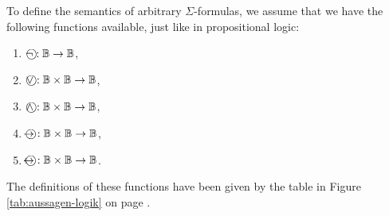 To define the semantics of arbitrary $\Sigma$-formulas, we assume that we have the following functions
available, just like in propositional logic: 
\begin{enumerate}
\item $\circneg: \mathbb{B} \rightarrow \mathbb{B}$,
\item $\circvee: \mathbb{B} \times \mathbb{B} \rightarrow \mathbb{B}$,
\item $\circwedge: \mathbb{B} \times \mathbb{B} \rightarrow \mathbb{B}$,
\item $\circright: \mathbb{B} \times \mathbb{B} \rightarrow \mathbb{B}$,
\item $\circleftright: \mathbb{B} \times \mathbb{B} \rightarrow \mathbb{B}$.
\end{enumerate}
The definitions of these functions have been given by the table in Figure \ref{tab:aussagen-logik} on page
\pageref{tab:aussagen-logik}.

